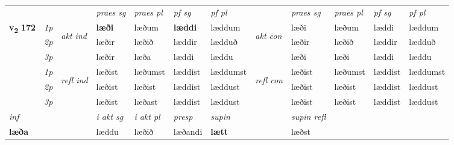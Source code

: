 \begin{longtable}[l]{X>{\footnotesize\itshape}llXXXXlXXXX}
 & &   & \textit{praes sg}  & \textit{praes pl}    & \textit{ pf sg} & \textit{pf pl} & & \textit{praes sg}  & \textit{praes pl}    & \textit{pf sg} & \textit{pf pl }  \\ \cmidrule{4-7} \cmidrule{9-12}
 \multirow{2}{*}{{{\textbf{v{\textsubscript{2}}} \Large{\textbf{172}}}}}  & 1p & \multirow{3}{*}{\begin{turn}{90}\textit{akt ind}\end{turn}} & \textbf{læði} & læðum & \textbf{læddi} & læddum & \multirow{3}{*}{\begin{turn}{90}\textit{akt con}\end{turn}} &læði & læðum & læddi & læddum\\*
 & 2p &  &  læðir  & læðið & læddir & lædduð & & læðir & læðið & læddir & lædduð \\*
 & 3p &  & læðir & læða & læddi & læddu & & læði & læði& læddi & læddu \\*
\cmidrule{4-7} \cmidrule{9-12}
 & 1p & \multirow{3}{*}{\begin{turn}{90}\textit{refl ind}\end{turn}}  & læðist & læðumst & læddist & læddumst & \multirow{3}{*}{\begin{turn}{90}\textit{refl con}\end{turn}}  &læðist & læðumst & læddist & læddumst \\*
 & 2p &  & læðist & læðist & læddist & læddust & &læðist & læðist & læddist & læddust \\*
 & 3p  & & læðist & læðast & læddist & læddust & & læðist & læðist& læddist & læddust \\*
\cmidrule{4-7} \cmidrule{9-12}

   {\textit{inf}} & &  & \textit{i akt sg} & \textit{i akt pl}   & \textit{presp} & \textit{supin} && \textit{supin refl}  \\*
  {\textbf{læða}} & && læddu  & læðið   & læðandi &  \textbf{lætt} && læðst  \\*

\midrule


\end{longtable}
